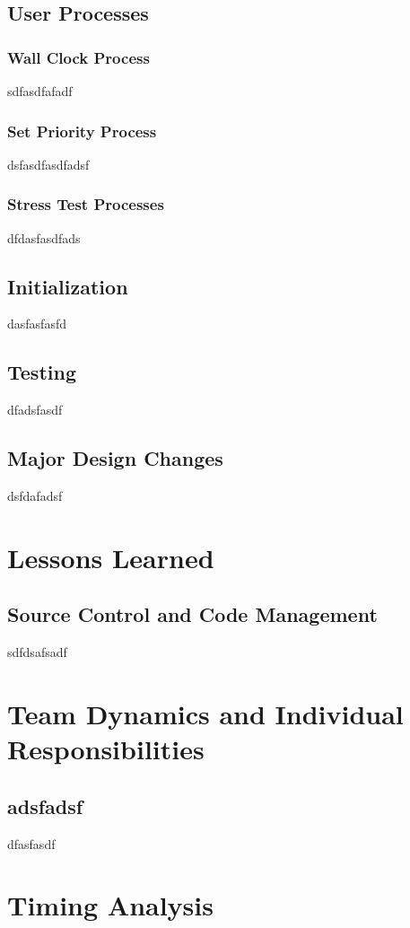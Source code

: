\documentclass[12pt]{report}
\begin{document}
\section{User Processes}

\subsection{Wall Clock Process}

sdfasdfafadf

\subsection{Set Priority Process}

dsfasdfasdfadsf

\subsection{Stress Test Processes}

dfdasfasdfads

\section{Initialization}

dasfasfasfd

\section{Testing}

dfadsfasdf

\section{Major Design Changes}

dsfdafadsf

\chapter{Lessons Learned}

\section{Source Control and Code Management}

sdfdsafsadf

\chapter{Team Dynamics and Individual Responsibilities}

\section{adsfadsf}

dfasfasdf

\chapter{Timing Analysis}
\end{document}

